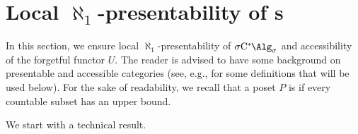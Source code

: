 \section{Local \texorpdfstring{$\aleph_1$}{א{1}}-presentability of \texorpdfstring{\cstars{}s}{σC*-algebras}}\label{sec:accessible}

In this section, we ensure local $\aleph_1$-presentability of $\SigmaC$ and accessibility of the forgetful functor $U$.
The reader is advised to have some background on presentable and accessible categories (see, e.g., \cite[Section 1 and 2]{adamek1994locallypresentable} for some definitions that will be used below).
For the sake of readability, we recall that a poset $P$ is  if every countable subset has an upper bound.

We start with a technical result.

